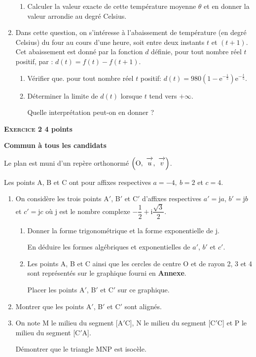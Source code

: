 \documentclass[10pt,a4paper]{article}
\newcommand{\vect}[1]{\overrightarrow{\,\mathstrut#1\,}}
\def\Ouv{$\left(\text{O},~\vect{u},~\vect{v}\right)$}
\begin{document}
\begin{enumerate}
\begin{enumerate}
		\item  Calculer la valeur exacte de cette température moyenne $\theta$ et en donner la valeur
arrondie au degré Celsius.
	\end{enumerate}
\item  Dans cette question, on s'intéresse à l'abaissement de température (en degré Celsius) du
four au cours d'une heure, soit entre deux instants $t$ et $(t + 1)$. Cet abaissement est donné
par la fonction $d$ définie, pour tout nombre réel $t$ positif, par : $d(t) = f(t) - f(t + 1)$.
	\begin{enumerate}
		\item Vérifier que. pour tout nombre réel $t$ positif: $d(t) = 980\left(1 - \text{e}^{- \frac{1}{5}}\right)\text{e}^{- \frac{t}{5}}$.
		\item Déterminer la limite de $d(t)$ lorsque $t$ tend vers $+ \infty$.
		
Quelle interprétation peut-on en donner ?
 	\end{enumerate}
\end{enumerate}

\newpage

\textbf{\textsc{Exercice 2} \hfill 4 points}
 
\textbf{Commun  à tous les candidats}

\medskip

Le plan est muni d'un repère orthonormé \Ouv.

\smallskip

Les points A, B et C ont pour affixes respectives $a = - 4,\: b = 2$ et $c = 4$.

\medskip

\begin{enumerate}
\item On considère les trois points A$'$, B$'$ et C$'$ d'affixes respectives $a'= \text{j}a$, $b'= \text{j}b$ et $c'= \text{j}c$ où j est le nombre complexe $-\dfrac{1}{2} + \text{i}\dfrac{\sqrt{3}}{2}$.

	\begin{enumerate}
		\item Donner la forme trigonométrique et la forme exponentielle de j.
		
En déduire les formes algébriques et exponentielles de $a'$, $b'$ et $c'$.
		\item Les points A, B et C ainsi que les cercles de centre O et de rayon 2, 3 et 4 sont
représentés sur le graphique fourni en \textbf{Annexe}.
		
Placer les points A$'$, B$'$ et C$'$ sur ce graphique.
	\end{enumerate}
\item Montrer que les points A$'$, B$'$ et C$'$ sont alignés.
\item On note M le milieu du segment [A$'$C], N le milieu du segment [C$'$C] et P le milieu du
segment [C$'$A]. 
	
Démontrer que le triangle MNP est isocèle.
\end{enumerate}
\end{document}
